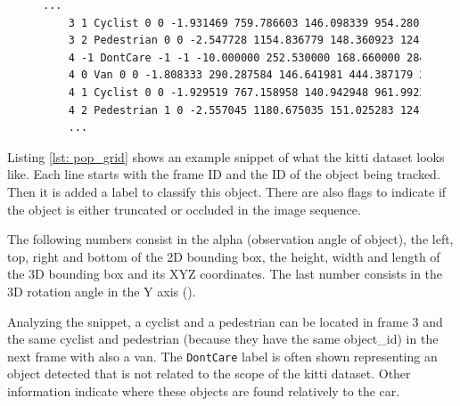 \begin{figure}
\begin{center}
	\begin{lstlisting}[caption={KITTI dataset file snippet presenting frame\_id, object\_id, label, truncated and occluded flags, alpha, left top and right bottom coordinates, height, width and length, 3D coordinates (x,y,z) and rotation}, language=xml, label={lst: pop_grid}]
	...
	3 1 Cyclist 0 0 -1.931469 759.786603 146.098339 954.280160 374.000000 1.739063 0.824591 1.785241 1.821119 1.569936 5.783265 -1.642450
	3 2 Pedestrian 0 0 -2.547728 1154.836779 148.360923 1241.000000 321.627088 1.714062 0.767881 0.972283 6.463579 1.474131 7.560739 -1.860031
	4 -1 DontCare -1 -1 -10.000000 252.530000 168.660000 284.460000 202.850000 -1000.000000 -1000.000000 -1000.000000 -10.000000 -1.000000 -1.000000 -1.000000
	4 0 Van 0 0 -1.808333 290.287584 146.641981 444.387179 269.473545 2.000000 1.823255 4.433886 -4.934786 1.601945 14.098646 -2.139796
	4 1 Cyclist 0 0 -1.929519 767.158958 140.942948 961.992360 374.000000 1.739063 0.824591 1.785241 1.881359 1.534695 5.785600 -1.631447
	4 2 Pedestrian 1 0 -2.557045 1180.675035 151.025283 1241.000000 325.015204 1.714062 0.767881 0.972283 6.516488 1.497786 7.267796 -1.846627
	...	\end{lstlisting}
\end{center}
\end{figure}

Listing \ref{lst: pop_grid} shows an example snippet of what the \gls{kitti} dataset looks like. Each line starts with the frame ID and the ID of the object being tracked. Then it is added a label to classify this object. There are also flags to indicate if the object is either truncated or occluded in the image sequence. 

The following numbers consist in the alpha (observation angle of object), the left, top, right and bottom of the 2D bounding box, the height, width and length of the 3D bounding box and its XYZ coordinates. The last number consists in the 3D rotation angle in the Y axis (\cite{Team}).

Analyzing the snippet, a cyclist and a pedestrian can be located in frame 3 and the same cyclist and pedestrian (because they have the same object\_id) in the next frame with also a van. The \texttt{DontCare} label is often shown representing an object detected that is not related to the scope of the \gls{kitti} dataset. Other information indicate where these objects are found relatively to the car.

